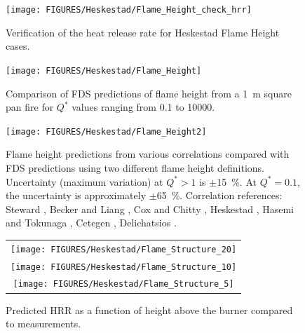\begin{figure}[h!]
\begin{center}
\texttt{[image: FIGURES/Heskestad/Flame\_Height\_check\_hrr]}
\end{center}
\caption[Verification of the heat release rate for Heskestad Flame Height cases]
{Verification of the heat release rate for Heskestad Flame Height cases.}
\label{Flame_Height_check_hrr}
\end{figure}

\clearpage

\begin{figure}[h!]
\begin{center}
\texttt{[image: FIGURES/Heskestad/Flame\_Height]}
\end{center}
\caption[Summary of flame height predictions, Heskestad correlation]
{Comparison of FDS predictions of flame height from a 1~m square pan fire for $Q^*$ values ranging from
0.1 to 10000.}
\label{Flame_Height}
\end{figure}

\begin{figure}[h!]
\texttt{[image: FIGURES/Heskestad/Flame\_Height2]}
\caption[Flame height uncertainty, multiple correlations and flame height definitions]
{Flame height predictions from various correlations compared with FDS predictions using two different flame height definitions.  Uncertainty (maximum variation) at $Q^*>1$ is $\pm$15~\%.  At $Q^*=0.1$, the uncertainty is approximately $\pm$65~\%. Correlation references: Steward \cite{Steward:1970}, Becker and Liang \cite{Becker:1978}, Cox and Chitty \cite{Cox:1985}, Heskestad \cite{SFPE:Heskestad}, Hasemi and Tokunaga \cite{Hasemi:1984}, Cetegen \cite{Cetegen:1984}, Delichatsios \cite{Delichatsios:1984}.}
\label{Flame_Height2}
\end{figure}


\begin{figure}[p]
\begin{center}
\begin{tabular}{c}
\texttt{[image: FIGURES/Heskestad/Flame\_Structure\_20]} \\
\texttt{[image: FIGURES/Heskestad/Flame\_Structure\_10]} \\
\texttt{[image: FIGURES/Heskestad/Flame\_Structure\_5]}
\end{tabular}
\end{center}
\caption[Predicted HRR as a function of height above the burner]{Predicted HRR as a function of height above the burner compared to measurements.}
\label{Flame_Structure}
\end{figure}


